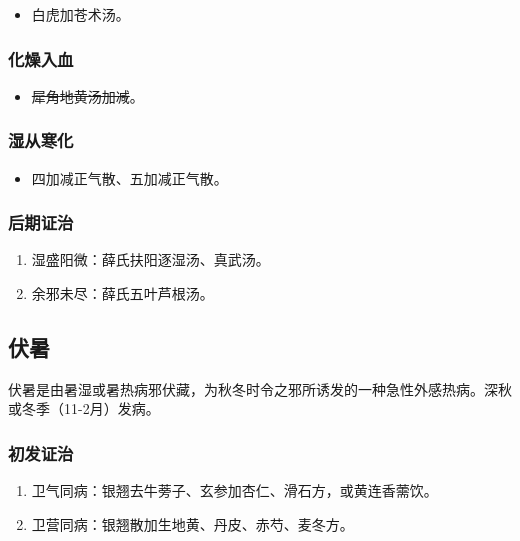 \documentclass[cn,black,12pt,founder,normal,twocolumn]{elegantnote}
\begin{document}
\begin{itemize}
    \item 白虎加苍术汤。
\end{itemize}

\subsubsection{化燥入血}

\begin{itemize}
    \item \sout{犀角地黄汤加减}。
\end{itemize}

\subsubsection{湿从寒化}

\begin{itemize}
    \item 四加减正气散、五加减正气散。
\end{itemize}

\subsubsection{后期证治}

\begin{enumerate}
    \item 湿盛阳微：薛氏扶阳逐湿汤、真武汤。
    \item 余邪未尽：薛氏五叶芦根汤。
\end{enumerate}

\subsection{伏暑}

伏暑是由暑湿或暑热病邪伏藏，为秋冬时令之邪所诱发的一种急性外感热病。深秋或冬季（11-2月）发病。

\subsubsection{初发证治}

\begin{enumerate}
    \item 卫气同病：银翘去牛蒡子、玄参加杏仁、滑石方，或黄连香薷饮。
    \item 卫营同病：银翘散加生地黄、丹皮、赤芍、麦冬方。
\end{enumerate}
\end{document}
